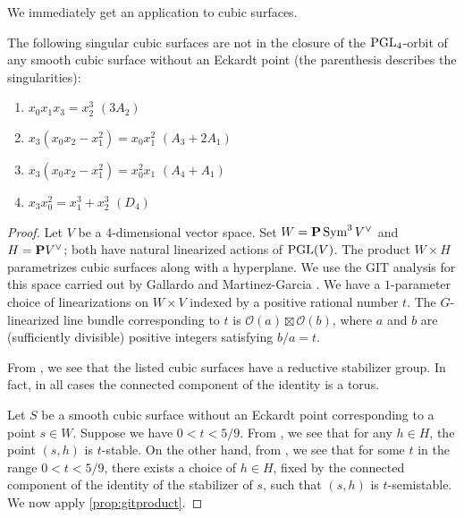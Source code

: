 \documentclass[11pt,reqno, letterpaper]{amsart}
\numberwithin{equation}{section}
\renewcommand{\O}{\mathcal O}
\begin{document}
We immediately get an application to cubic surfaces.
\begin{proposition}\label{prop:isogood}
  The following singular cubic surfaces are not in the closure of the $\PGL_4$-orbit of any smooth cubic surface without an Eckardt point (the parenthesis describes the singularities):
  \begin{enumerate}
  \item $x_0x_1x_3 = x_2^3$ \quad $(3A_2)$
  \item $x_3(x_0x_2-x_1^2) = x_0x_1^2$ \quad $(A_3 + 2A_1)$
  \item $x_3(x_0x_2-x_1^2) = x_0^2x_1$ \quad $(A_4 + A_1)$
  \item $x_3x_0^2 = x_1^3 + x_2^3$ \quad $(D_4)$
  \end{enumerate}
\end{proposition}
\begin{proof}
  Let $V$ be a 4-dimensional vector space.
  Set $W = \P \Sym^3 V^\vee$ and $H = \P V^\vee$; both have natural linearized actions of $\PGL(V)$.
  The product $W \times H$ parametrizes cubic surfaces along with a hyperplane.
  We use the GIT analysis for this space carried out by Gallardo and Martinez-Garcia \cite{gal.mar:19}.
  We have a $1$-parameter choice of linearizations on $W \times V$ indexed by a positive rational number $t$.
  The $G$-linearized line bundle corresponding to $t$ is $\O(a) \boxtimes \O(b)$, where $a$ and $b$ are (sufficiently divisible) positive integers satisfying $b/a = t$.

  From \cite[Theorem~3]{sak:10}, we see that the listed cubic surfaces have a reductive stabilizer group.
  In fact, in all cases the connected component of the identity is a torus.

  Let $S$ be a smooth cubic surface without an Eckardt point corresponding to a point $s \in W$.
  Suppose we have $0 < t < 5/9$.
  From \cite[Theorem~2]{gal.mar:19}, we see  that for any $h \in H$, the point $(s,h)$ is $t$-stable.
  On the other hand, from \cite[Table 2]{gal.mar:19}, we see that for some $t$ in the range $0 < t < 5/9$, there exists a choice of $h \in H$, fixed by the connected component of the identity of the stabilizer of $s$, such that $(s,h)$ is $t$-semistable.
  We now apply \autoref{prop:gitproduct}.


\end{proof}
\end{document}
